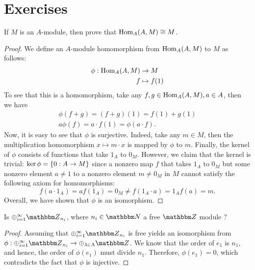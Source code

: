 \section{Exercises}
\begin{exercise}\label{ex: ch3-1}
If $M$ is an $A$-module, then prove that ${\operatorname{\text{Hom\/}}}_A(A, M ) \cong M$.
\end{exercise}
\begin{proof}
We define an $A$-module homomorphism from $\operatorname{\text{Hom\/}}_A(A,M)$ to $M$ as follows:
\[
\begin{aligned}
    \phi: \operatorname{\text{Hom\/}}_A(A,M) &\to M\\
f &\mapsto f(1)
\end{aligned}
\]
To see that this is a homomorphism, take any $f,g \in \operatorname{\text{Hom\/}}_A(A,M), a \in A$, then we have
\[
\begin{aligned}
\phi(f+g) = (f+g)(1) = f(1) + g(1) \\
a\phi(f) = a\cdot f(1) = \phi(a\cdot f).
\end{aligned}
\]
Now, it is easy to see that $\phi$ is surjective. Indeed, take any $m \in M$, then the multiplication homomorphism $x \mapsto m\cdot x$ is mapped by $\phi$ to $m$. Finally, the kernel of $\phi$ consists of functions that take $1_A$ to $0_M$. However, we claim that the kernel is trivial: $\operatorname{\text{ker\/}}\phi = \{0: A \to M\}$ since a nonzero map $f$ that takes $1_A$ to $0_M$ but some nonzero element $a \neq 1$ to a nonzero element $m \neq 0_M$ in $M$ cannot satisfy the following axiom for homomorphisms:
\[
f(a\cdot 1_A) = af(1_A) = 0_M \neq f(1_A \cdot a) = 1_Af(a) = m.
\] Overall, we have shown that $\phi$ is an isomorphism.
\end{proof}

\begin{exercise}\label{ex: ch3-2}
 Is $\oplus_{i=1}^{\infty} {\Z}_{n_i}$, where $n_i \in {\N}$ a free ${\Z}$ module ?
\end{exercise}
\begin{proof}
Assuming that $\oplus_{i=1}^{\infty} {\Z}_{n_i}$ is free yields an isomorphism from $\phi: \oplus_{i=1}^{\infty} {\Z}_{n_i} \to \oplus_{\lambda \in \Lambda} {\Z}$. We know that the order of $e_1$ is $n_1$, and hence, the order of $\phi(e_1)$ must divide $n_1$. Therefore, $\phi(e_1) = 0$, which contradicts the fact that $\phi$ is injective.
\end{proof}


